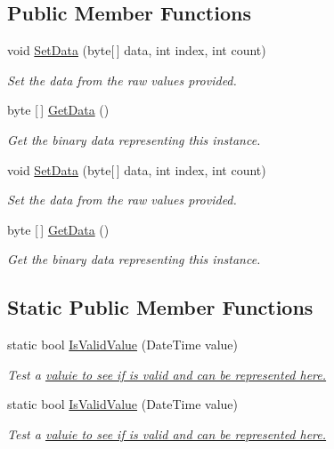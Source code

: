 \subsection*{Public Member Functions}
\begin{DoxyCompactItemize}
\item 
void \hyperlink{class_i_c_sharp_code_1_1_sharp_zip_lib_1_1_zip_1_1_n_t_tagged_data_a75c80e10464f66b0cfbbeaf2c5bdfabd}{Set\+Data} (byte\mbox{[}$\,$\mbox{]} data, int index, int count)
\begin{DoxyCompactList}\small\item\em Set the data from the raw values provided. \end{DoxyCompactList}\item 
byte \mbox{[}$\,$\mbox{]} \hyperlink{class_i_c_sharp_code_1_1_sharp_zip_lib_1_1_zip_1_1_n_t_tagged_data_adde7c262e6270ca2419f1d4a26a9701a}{Get\+Data} ()
\begin{DoxyCompactList}\small\item\em Get the binary data representing this instance. \end{DoxyCompactList}\item 
void \hyperlink{class_i_c_sharp_code_1_1_sharp_zip_lib_1_1_zip_1_1_n_t_tagged_data_a75c80e10464f66b0cfbbeaf2c5bdfabd}{Set\+Data} (byte\mbox{[}$\,$\mbox{]} data, int index, int count)
\begin{DoxyCompactList}\small\item\em Set the data from the raw values provided. \end{DoxyCompactList}\item 
byte \mbox{[}$\,$\mbox{]} \hyperlink{class_i_c_sharp_code_1_1_sharp_zip_lib_1_1_zip_1_1_n_t_tagged_data_adde7c262e6270ca2419f1d4a26a9701a}{Get\+Data} ()
\begin{DoxyCompactList}\small\item\em Get the binary data representing this instance. \end{DoxyCompactList}\end{DoxyCompactItemize}
\subsection*{Static Public Member Functions}
\begin{DoxyCompactItemize}
\item 
static bool \hyperlink{class_i_c_sharp_code_1_1_sharp_zip_lib_1_1_zip_1_1_n_t_tagged_data_ae4fe23410bbadf234c3ba5bcb888dcf0}{Is\+Valid\+Value} (Date\+Time value)
\begin{DoxyCompactList}\small\item\em Test a \hyperlink{}{valuie to see if is valid and can be represented here.} \end{DoxyCompactList}\item 
static bool \hyperlink{class_i_c_sharp_code_1_1_sharp_zip_lib_1_1_zip_1_1_n_t_tagged_data_ae4fe23410bbadf234c3ba5bcb888dcf0}{Is\+Valid\+Value} (Date\+Time value)
\begin{DoxyCompactList}\small\item\em Test a \hyperlink{}{valuie to see if is valid and can be represented here.} \end{DoxyCompactList}\end{DoxyCompactItemize}
